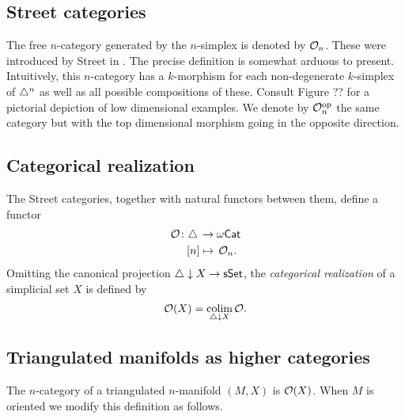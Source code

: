 \subsection{Street categories}

The free $n$-category generated by the $n$-simplex is denoted by $\mathcal{O}_n$.
These were introduced by Street in \cite{street1987orientals}.
The precise definition is somewhat arduous to present.
Intuitively, this $n$-category has a $k$-morphism for each non-degenerate $k$-simplex of $\triangle^n$ as well as all possible compositions of these.
Consult Figure ?? for a pictorial depiction of low dimensional examples.
We denote by $\mathcal{O}_n^{\mathrm{op}}$ the same category but with the top dimensional morphism going in the opposite direction.

\subsection{Categorical realization}

The Street categories, together with natural functors between them, define a functor
\[
\begin{split}
	\mathcal{O} \colon \triangle \, &\to \omega\mathsf{Cat} \\
	[n] &\mapsto \, \mathcal{O}_n.
\end{split}
\]
Omitting the canonical projection $\triangle \downarrow X \to \mathsf{sSet}$, the \textit{categorical realization} of a simplicial set $X$ is defined by
\[
\mathcal{O}(X) = \operatorname*{colim}_{\triangle \downarrow X} \mathcal{O}.
\]

\subsection{Triangulated manifolds as higher categories}

The $n$-category of a triangulated $n$-manifold $(M, X)$ is $\mathcal{O}(X)$.
When $M$ is oriented we modify this definition as follows.

